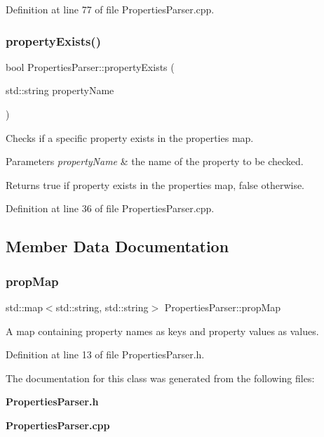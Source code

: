Definition at line 77 of file Properties\+Parser.\+cpp.

\mbox{\label{class_properties_parser_a75272b9a95defaf287a061e45f8acc51}} 
\subsubsection{property\+Exists()}
{\footnotesize\ttfamily bool Properties\+Parser\+::property\+Exists (\begin{DoxyParamCaption}\item[{std\+::string}]{property\+Name }\end{DoxyParamCaption})}

Checks if a specific property exists in the properties map. 
\begin{DoxyParams}{Parameters}
{\em property\+Name} & the name of the property to be checked. \\
\hline
\end{DoxyParams}
\begin{DoxyReturn}{Returns}
true if property exists in the properties map, false otherwise. 
\end{DoxyReturn}


Definition at line 36 of file Properties\+Parser.\+cpp.



\subsection{Member Data Documentation}
\mbox{\label{class_properties_parser_a3a1d77a3b2bad9327510f594c193f624}} 
\subsubsection{prop\+Map}
{\footnotesize\ttfamily std\+::map$<$std\+::string, std\+::string$>$ Properties\+Parser\+::prop\+Map\hspace{0.3cm}{\ttfamily [protected]}}

A map containing property names as keys and property values as values. 

Definition at line 13 of file Properties\+Parser.\+h.



The documentation for this class was generated from the following files\+:\begin{DoxyCompactItemize}
\item 
\textbf{ Properties\+Parser.\+h}\item 
\textbf{ Properties\+Parser.\+cpp}\end{DoxyCompactItemize}
